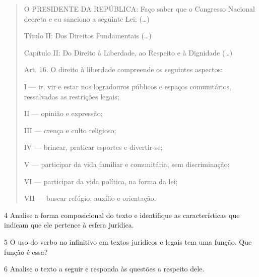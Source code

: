 \begin{quote}
O PRESIDENTE DA REPÚBLICA: Faço saber que o Congresso Nacional decreta e
eu sanciono a seguinte Lei: (\ldots{})

Título II: Dos Direitos Fundamentais (\ldots{})

Capítulo II: Do Direito à Liberdade, ao Respeito e à Dignidade (\ldots{})

Art. 16. O direito à liberdade compreende os seguintes aspectos:

I --- ir, vir e estar nos logradouros públicos e espaços comunitários,
ressalvadas as restrições legais;

II --- opinião e expressão;

III --- crença e culto religioso;

IV --- brincar, praticar esportes e divertir-se;

V --- participar da vida familiar e comunitária, sem discriminação;

VI --- participar da vida política, na forma da lei;

VII --- buscar refúgio, auxílio e orientação. \\

\end{quote}


\num{4} Analise a forma composicional do texto e identifique as características que
indicam que ele pertence à esfera jurídica.


\num{5} O uso do verbo no infinitivo em textos jurídicos e legais tem uma função. 
Que função é essa?


\num{6} Analise o texto a seguir e responda às questões a respeito dele. 


